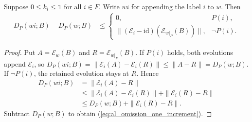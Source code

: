 \begin{theorem}
    \label{thm:al_channel_word_omission_increment}
    \leanok
    Suppose $0\le k_i\le\mathbb 1$ for all $i\in F$.
    Write $wi$ for appending the label $i$ to $w$. Then
    \begin{align}
        \label{eq:al_omission_one_increment}
        D_P(wi;B)-D_P(w;B)
         & \le
        \left\{\begin{array}{ll}
                   0,                        & P(i),      \\
                   \|(\mathcal E_i-\mathrm{id})
                   (\mathcal E_{w|_P}(B))\|, & \neg P(i).
               \end{array}\right.
    \end{align}
\end{theorem}
\begin{proof}
    \leanok
    Put $A=\mathcal E_w(B)$ and $R=\mathcal E_{w|_P}(B)$.
    If $P(i)$ holds, both evolutions append $\mathcal E_i$, so
    $D_P(wi;B)=\|\mathcal E_i(A)-\mathcal E_i(R)\|
        \le\|A-R\|=D_P(w;B)$.
    If $\neg P(i)$, the retained evolution stays at $R$. Hence
    \begin{align}
        \label{eq:al_omission_triangle_step}
        D_P(wi;B)
         & =\|\mathcal E_i(A)-R\|\nonumber        \\
         & \le\|\mathcal E_i(A)-\mathcal E_i(R)\|
        +\|\mathcal E_i(R)-R\|\nonumber           \\
         & \le D_P(w;B)+\|\mathcal E_i(R)-R\|.
    \end{align}
    Subtract $D_P(w;B)$ to obtain
    (\ref{eq:al_omission_one_increment}).
\end{proof}

